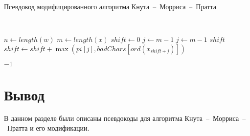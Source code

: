 \begin{algorithm}[H]
	\caption{Псевдокод модифицированного алгоритма  Кнута~--~Морриса~--~Пратта}
	\label{alg:alg_04}
	\\
	\begin{algorithmic}[1]
		\State $n \gets length(w)$
		\State $m \gets length(x)$
		\State $shift \gets 0$
			\State $j \gets m - 1$
				\State $j \gets m - 1$
			\EndWhile
				\Return $shift$
			\Else
				\State $shift \gets shift + \max(pi[j], badChars[ord(x_{shift + j})])$
			\EndIf
		\EndWhile
		
		\Return $-1$
		\EndFunction
	\end{algorithmic}
\end{algorithm}

\section*{Вывод}
В данном разделе были описаны псевдокоды для алгоритма Кнута~--~Морриса~--~Пратта и его модификации. 